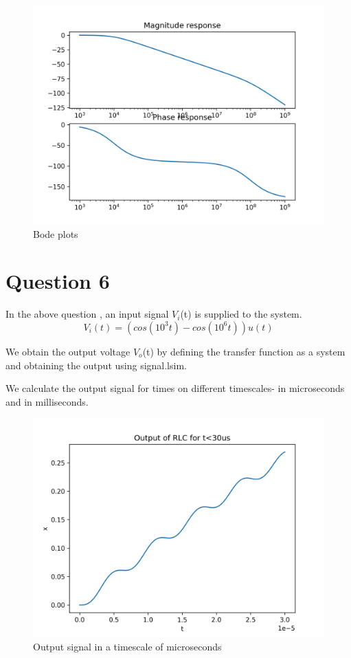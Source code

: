 \documentclass[11pt, a4paper]{article}
\begin{document}
\begin{figure}[!tbh]
\centering
\includegraphics[scale=0.65]{assgn7_plot9.png} 
\caption{Bode plots}
\label{fig9}
\end{figure}

\section*{Question 6}
In the above question , an input signal $V_i$(t) is supplied to the system.
\begin{equation}
	V_i(t) = (cos(10^3t) - cos(10^6t))u(t)
\end{equation}

We obtain the output voltage $V_o$(t) by defining the transfer function as a system and obtaining the output using signal.lsim.

We calculate the output signal for times on different timescales- in microseconds and in milliseconds.



\begin{figure}[!tbh]
\centering
\includegraphics[scale=0.6]{assgn7_plot10.png} 
\caption{Output signal in a timescale of microseconds}
\label{fig10}
\end{figure}
\end{document}
